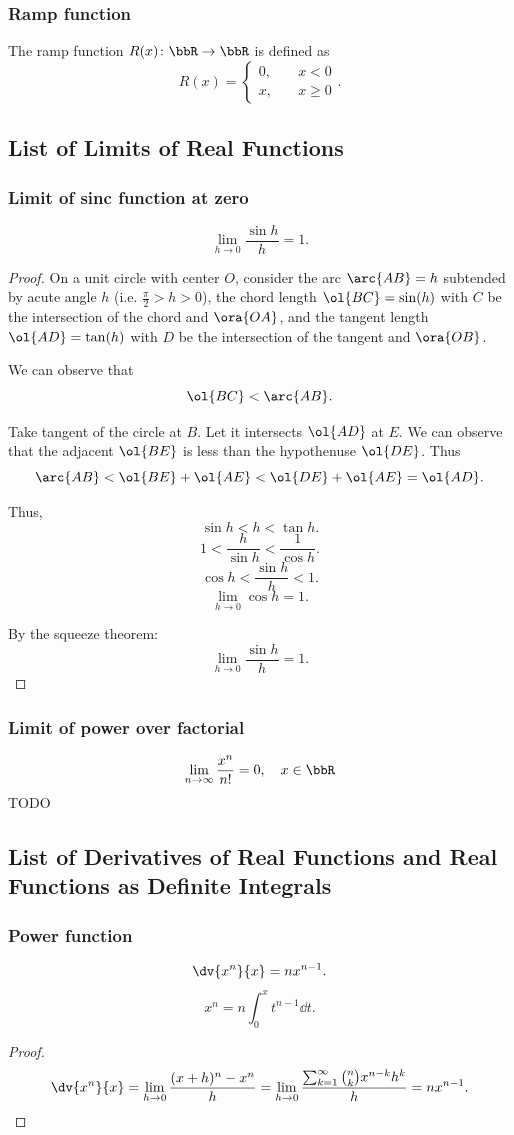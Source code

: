 \subsubsection{Ramp function}
The ramp function $R(x)\colon\bbR\to\bbR$ is defined as
\[R(x)=
\begin{cases}0,\quad &x<0\\
x,\quad &x\geq 0
\end{cases}.\]
\subsection{List of Limits of Real Functions}
\subsubsection{Limit of sinc function at zero}
\[\lim_{h\to 0}\frac{\sin h}{h}=1.\]
\begin{proof}
On a unit circle with center $O$, consider the arc $\arc{AB}=h$ subtended by acute angle $h$ (i.e. $\frac{\pi}{2}>h>0$), the chord length $\ol{BC}=\sin(h)$ with $C$ be the intersection of the chord and $\ora{OA}$, and the tangent length $\ol{AD}=\tan(h)$ with $D$ be the intersection of the tangent and $\ora{OB}$.

We can observe that
\[\ol{BC}<\arc{AB}.\]

Take tangent of the circle at $B$. Let it intersects $\ol{AD}$ at $E$. We can observe that the adjacent $\ol{BE}$ is less than the hypothenuse $\ol{DE}$. Thus
\[\arc{AB}<\ol{BE}+\ol{AE}<\ol{DE}+\ol{AE}=\ol{AD}.\]

Thus,
\[\sin h<h<\tan h.\]
\[1<\frac{h}{\sin h}<\frac{1}{\cos h}.\]
\[\cos h<\frac{\sin h}{h}<1.\]
\[\lim_{h\to 0}\cos h=1.\]

By the squeeze theorem:
\[\lim_{h\to 0}\frac{\sin h}{h}=1.\]
\end{proof}
\subsubsection{Limit of power over factorial}
\[\lim_{n\to\infty}\frac{x^n}{n!}=0,\quad x\in\bbR\]
\bpr
TODO
\epr
\subsection{List of Derivatives of Real Functions and Real Functions as Definite Integrals}
\subsubsection{Power function}
\[\dv{x^n}{x}=nx^{n-1}.\]
\[x^n=n\int_0^xt^{n-1}\dd{t}.\]
\begin{proof}
\[\dv{x^n}{x}=\lim_{h\to 0}\frac{(x+h)^n-x^n}{h}=\lim_{h\to 0}\frac{\sum_{k=1}^{\infty}\binom{n}{k}x^{n-k}h^k}{h}=nx^{n-1}.\]
\end{proof}
